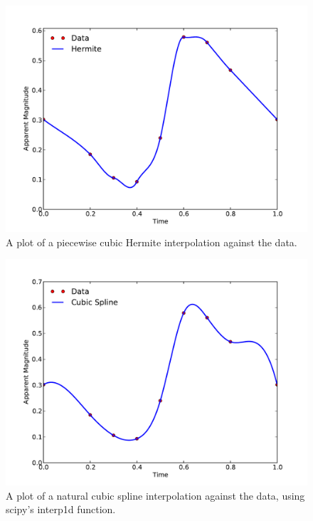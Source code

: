 \documentclass[11pt,letterpaper]{article}
\begin{document}
\begin{figure}[!htb]\centering
  \includegraphics[width=1\textwidth]{Hermite}
  \caption{A plot of a piecewise cubic Hermite interpolation against the data.}
  \end{figure}

\begin{figure}[!htb]\centering
  \includegraphics[width=1\textwidth]{Spline}
  \caption{A plot of a natural cubic spline interpolation against the data, using scipy's interp1d function.}
  \end{figure}
\end{document}
